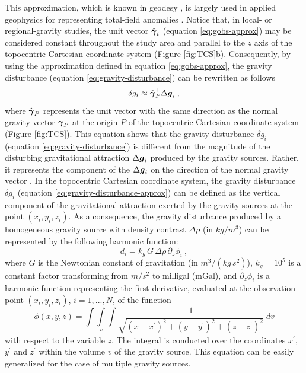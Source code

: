 \documentclass[extra]{gji}
\begin{document}
This approximation, which is known in geodesy \citep[e.g.,][]{sanso_sideris2013},
is largely used in applied geophysics for representing
total-field anomalies \citep[e.g.,][]{blakely1996}.
Notice that, in local- or regional-gravity studies, the unit
vector $\hat{\mitbf{\gamma}}_{i}$ (equation \ref{eq:gobs-approx}) 
may be considered constant throughout the study area and 
parallel to the $z$ axis of the topocentric Cartesian coordinate 
system (Figure \ref{fig:TCS}b).
Consequently, by using the approximation defined in equation 
\ref{eq:gobs-approx}, the gravity disturbance 
(equation \ref{eq:gravity-disturbance}) can be rewritten as 
follows 
\begin{equation}
\delta g_{i} \approx \hat{\mitbf{\gamma}}_{P}^{\top} \Delta \mitbf{g}_{i} \: ,
\label{eq:gravity-disturbance-approx}
\end{equation}
where $\hat{\mitbf{\gamma}}_{P}$ represents the unit vector with
the same direction as the normal gravity vector $\mitbf{\gamma}_{P}$
at the origin $P$ of the topocentric Cartesian coordinate system
(Figure \ref{fig:TCS}).
This equation shows that the gravity disturbance $\delta g_{i}$ (equation \ref{eq:gravity-disturbance}) is different from the magnitude
of the disturbing gravitational attraction $\Delta \mitbf{g}_{i}$
produced by the gravity sources. Rather, it represents the 
component of the $\Delta \mitbf{g}_{i}$ on the direction of the normal
gravity vector \citep{sanso_sideris2013}. 
In the topocentric Cartesian coordinate system,
the gravity disturbance $\delta g_{i}$ (equation \ref{eq:gravity-disturbance-approx})
can be defined as the vertical component of the gravitational attraction exerted by
the gravity sources at the point $(x_{i}, y_{i}, z_{i})$.
As a consequence, the gravity disturbance produced by
a homogeneous gravity source with density contrast $\Delta\rho$
(in $kg / m^{3}$) can be represented by the following harmonic function:
\begin{equation}
d_{i} = k_{g} \, G \, \Delta\rho \, \partial_{z} \phi_{i} \: ,
\label{eq:gz-local}
\end{equation}
where $G$ is the Newtonian constant of gravitation
(in $m^{3} / (kg \, s^{2})$),
$k_{g} = 10^{5}$ is a constant factor
transforming from $m/s^{2}$ to milligal (mGal),
and $\partial_{z} \phi_{i}$ is a harmonic function representing the first 
derivative, evaluated at the observation point $(x_{i},y_{i},z_{i})$, 
$i = 1, ..., N$, of the function 
\begin{equation}
\phi(x,y,z) = \int\int\limits_{v}\int \frac{1}{\sqrt{(x - x^{\prime})^{2} + 
(y - y^{\prime})^{2} + (z - z^{\prime})^{2}}} \: dv
\label{eq:phi}
\end{equation}
with respect to the variable $z$. The 
integral is conducted over the coordinates $x^{\prime}$, $y^{\prime}$ 
and $z^{\prime}$ within the volume $v$ of the gravity source.
This equation can be easily generalized for the case
of multiple gravity sources.
\end{document}
